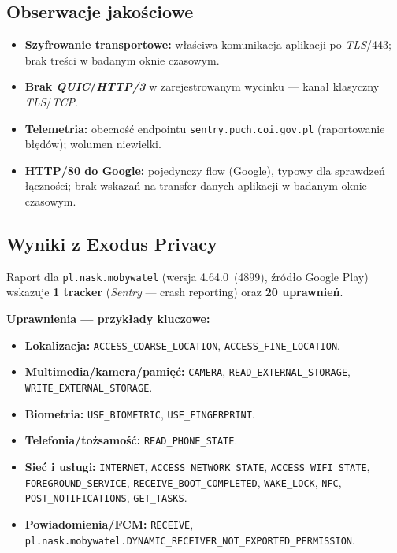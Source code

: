 \subsection{Obserwacje jakościowe}
\begin{itemize}
  \item \textbf{Szyfrowanie transportowe:} właściwa komunikacja aplikacji po \emph{TLS}/443; brak treści w badanym oknie czasowym.
  \item \textbf{Brak \emph{QUIC}/\emph{HTTP/3}} w zarejestrowanym wycinku — kanał klasyczny \emph{TLS}/\emph{TCP}.
  \item \textbf{Telemetria:} obecność endpointu \texttt{sentry.puch.coi.gov.pl} (raportowanie błędów); wolumen niewielki.
  \item \textbf{HTTP/80 do Google:} pojedynczy flow (Google), typowy dla sprawdzeń łączności; brak wskazań na transfer danych aplikacji w badanym oknie czasowym.
\end{itemize}

\subsection{Wyniki z Exodus Privacy  \cite{ExodusPrivacy}}
Raport dla \texttt{pl.nask.mobywatel} (wersja 4.64.0 \,(4899), źródło Google Play) wskazuje \textbf{1 tracker} (\emph{Sentry} — crash reporting) oraz \textbf{20 uprawnień}. 

\textbf{Uprawnienia — przykłady kluczowe:}
\begin{itemize}
  \item \textbf{Lokalizacja:} \texttt{ACCESS\_COARSE\_LOCATION}, \texttt{ACCESS\_FINE\_LOCATION}.
  \item \textbf{Multimedia/kamera/pamięć:} \texttt{CAMERA}, \texttt{READ\_EXTERNAL\_STORAGE}, \texttt{WRITE\_EXTERNAL\_STORAGE}.
  \item \textbf{Biometria:} \texttt{USE\_BIOMETRIC}, \texttt{USE\_FINGERPRINT}.
  \item \textbf{Telefonia/tożsamość:} \texttt{READ\_PHONE\_STATE}.
  \item \textbf{Sieć i usługi:} \texttt{INTERNET}, \texttt{ACCESS\_NETWORK\_STATE}, \texttt{ACCESS\_WIFI\_STATE}, \texttt{FOREGROUND\_SERVICE}, \texttt{RECEIVE\_BOOT\_COMPLETED}, \texttt{WAKE\_LOCK}, \texttt{NFC}, \texttt{POST\_NOTIFICATIONS}, \texttt{GET\_TASKS}.
  \item \textbf{Powiadomienia/FCM:} \texttt{RECEIVE}, \texttt{pl.nask.mobywatel.DYNAMIC\_RECEIVER\_NOT\_EXPORTED\_PERMISSION}.
\end{itemize}

